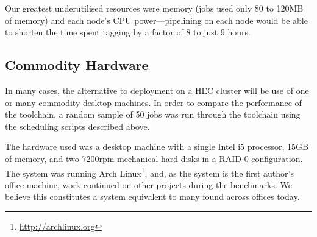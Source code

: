 Our greatest underutilised resources were memory (jobs used only 80 to 120MB of memory) and each node's CPU power---pipelining on each node would be able to shorten the time spent tagging by a factor of 8 to just 9 hours.




\subsection{Commodity Hardware}
In many cases, the alternative to deployment on a HEC cluster will be use of one or many commodity desktop machines.  In order to compare the performance of the toolchain, a random sample of 50 jobs was run through the toolchain using the scheduling scripts described above.

The hardware used was a desktop machine with a single Intel i5 processor, 15GB of memory, and two 7200rpm mechanical hard disks in a RAID-0 configuration.  The system was running Arch Linux\footnote{\url{http://archlinux.org}}, and, as the system is the first author's office machine, work continued on other projects during the benchmarks.  We believe this constitutes a system equivalent to many found across offices today.


